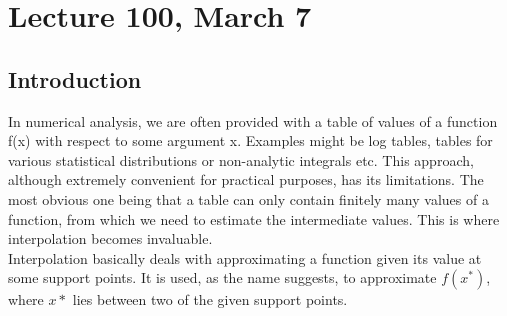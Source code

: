 \chapter*{Lecture 100, March 7}
\setcounter{chapter}{4}
\setcounter{section}{0}

\section{Introduction}

In numerical analysis, we are often provided with a table of values of a function f(x) with respect to some argument x. Examples might be log tables, tables for various statistical distributions or non-analytic integrals etc. This approach, although extremely convenient for practical purposes, has its limitations. The most obvious one being that a table can only contain finitely many values of a function, from which we need to estimate the intermediate values. This is where interpolation becomes invaluable.\\
Interpolation basically deals with approximating a function given its value at some support points. It is used, as the name suggests, to approximate $f(x^*)$, where $x*$ lies between two of the given support points.
